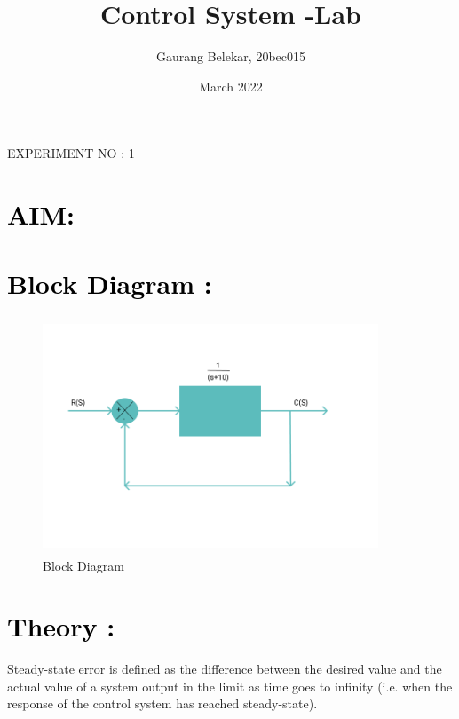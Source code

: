 \documentclass[12pt]{article}
\title{Control System -Lab}
\author{Gaurang Belekar, 20bec015}
\date{March 2022}
\begin{document}
\maketitle
\begin{center}
\end{center}
\pagebreak

\begin{center}
    \LARGE {EXPERIMENT NO : 1}
             
\end{center}

\section*{\textcolor{black}{AIM: }}

\section*{\textcolor{black}{Block Diagram :}}
\begin{figure}[!hth]
        \centering
        \includegraphics[width =10cm, height = 7cm]{images/exp1.png}
        \caption{Block Diagram}
        \label{Graph}
\end{figure}

\newline

\section*{\textcolor{black}{Theory :}}
Steady-state error is defined as the difference between the desired value and the actual value of a system output in the limit as time goes to infinity (i.e. when the response of the control system has reached steady-state).\par
\end{document}
